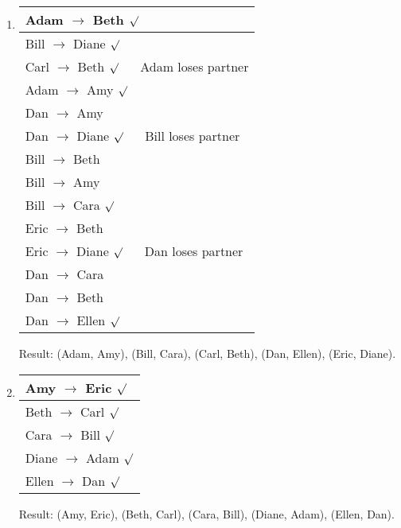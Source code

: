 \documentclass{scrartcl}
\begin{document}
\begin{enumerate}
		\item\phantom{phantom}
		\begin{center}
			\begin{tabular}{|l|}
				\hline
				Adam $\to$ Beth $\surd$\\\hline
				Bill $\to$ Diane $\surd$\\\hline
				Carl $\to$ Beth $\surd$ $\quad$ Adam loses partner\\\hline
				Adam $\to$ Amy $\surd$\\\hline
				Dan $\to$ Amy \lightning\\\hline
				Dan $\to$ Diane $\surd$ $\quad$ Bill loses partner\\\hline
				Bill $\to$ Beth \lightning\\\hline
				Bill $\to$ Amy \lightning\\\hline
				Bill $\to$ Cara $\surd$\\\hline
				Eric $\to$ Beth \lightning\\\hline
				Eric $\to$ Diane $\surd$ $\quad$ Dan loses partner\\\hline
				Dan $\to$ Cara \lightning\\\hline
				Dan $\to$ Beth \lightning\\\hline
				Dan $\to$ Ellen $\surd$\\
				\hline
			\end{tabular}
		\end{center}
		Result: (Adam, Amy), (Bill, Cara), (Carl, Beth), (Dan, Ellen), (Eric, Diane).
		
		\item\phantom{phantom}
		\begin{center}
			\begin{tabular}{|l|}
				\hline
				Amy $\to$ Eric $\surd$\\\hline
				Beth $\to$ Carl $\surd$\\\hline
				Cara $\to$ Bill $\surd$\\\hline
				Diane $\to$ Adam $\surd$\\\hline
				Ellen $\to$ Dan $\surd$\\
				\hline
			\end{tabular}
		\end{center}
	Result: (Amy, Eric), (Beth, Carl), (Cara, Bill), (Diane, Adam), (Ellen, Dan).
		
	\end{enumerate}
	
\end{document}
